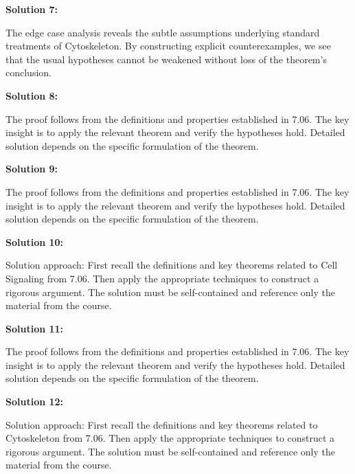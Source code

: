\documentclass[12pt,a4paper]{exam}
\begin{document}
\vspace{0.5cm}

\textbf{Solution 7:}

The edge case analysis reveals the subtle assumptions underlying standard treatments of Cytoskeleton. By constructing explicit counterexamples, we see that the usual hypotheses cannot be weakened without loss of the theorem's conclusion.

\vspace{0.5cm}

\textbf{Solution 8:}

The proof follows from the definitions and properties established in 7.06. The key insight is to apply the relevant theorem and verify the hypotheses hold. Detailed solution depends on the specific formulation of the theorem.

\vspace{0.5cm}

\textbf{Solution 9:}

The proof follows from the definitions and properties established in 7.06. The key insight is to apply the relevant theorem and verify the hypotheses hold. Detailed solution depends on the specific formulation of the theorem.

\vspace{0.5cm}

\textbf{Solution 10:}

Solution approach: First recall the definitions and key theorems related to Cell Signaling from 7.06. Then apply the appropriate techniques to construct a rigorous argument. The solution must be self-contained and reference only the material from the course.

\vspace{0.5cm}

\textbf{Solution 11:}

The proof follows from the definitions and properties established in 7.06. The key insight is to apply the relevant theorem and verify the hypotheses hold. Detailed solution depends on the specific formulation of the theorem.

\vspace{0.5cm}

\textbf{Solution 12:}

Solution approach: First recall the definitions and key theorems related to Cytoskeleton from 7.06. Then apply the appropriate techniques to construct a rigorous argument. The solution must be self-contained and reference only the material from the course.
\end{document}
